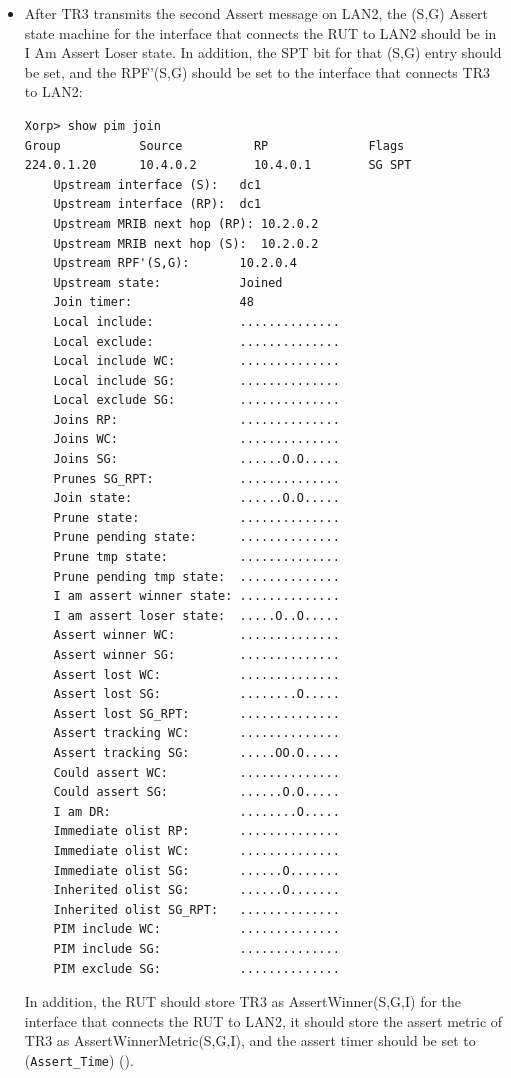 \documentclass[11pt]{report}
\begin{document}
\begin{itemize}
  \item After TR3 transmits the second Assert message on LAN2, the (S,G) Assert
  state machine for the interface that connects the RUT to LAN2 should be in I
  Am Assert Loser state. In addition, the SPT bit for that (S,G) entry should
  be set, and the RPF'(S,G) should be set to the interface that connects TR3
  to LAN2:

\begin{verbatim}
Xorp> show pim join 
Group           Source          RP              Flags
224.0.1.20      10.4.0.2        10.4.0.1        SG SPT 
    Upstream interface (S):   dc1
    Upstream interface (RP):  dc1
    Upstream MRIB next hop (RP): 10.2.0.2
    Upstream MRIB next hop (S):  10.2.0.2
    Upstream RPF'(S,G):       10.2.0.4
    Upstream state:           Joined 
    Join timer:               48
    Local include:            ..............
    Local exclude:            ..............
    Local include WC:         ..............
    Local include SG:         ..............
    Local exclude SG:         ..............
    Joins RP:                 ..............
    Joins WC:                 ..............
    Joins SG:                 ......O.O.....
    Prunes SG_RPT:            ..............
    Join state:               ......O.O.....
    Prune state:              ..............
    Prune pending state:      ..............
    Prune tmp state:          ..............
    Prune pending tmp state:  ..............
    I am assert winner state: ..............
    I am assert loser state:  .....O..O.....
    Assert winner WC:         ..............
    Assert winner SG:         ..............
    Assert lost WC:           ..............
    Assert lost SG:           ........O.....
    Assert lost SG_RPT:       ..............
    Assert tracking WC:       ..............
    Assert tracking SG:       .....OO.O.....
    Could assert WC:          ..............
    Could assert SG:          ......O.O.....
    I am DR:                  ........O.....
    Immediate olist RP:       ..............
    Immediate olist WC:       ..............
    Immediate olist SG:       ......O.......
    Inherited olist SG:       ......O.......
    Inherited olist SG_RPT:   ..............
    PIM include WC:           ..............
    PIM include SG:           ..............
    PIM exclude SG:           ..............
\end{verbatim}

  In addition, the RUT should store TR3 as AssertWinner(S,G,I) for the
  interface that connects the RUT to LAN2, it should store the assert metric
  of TR3 as AssertWinnerMetric(S,G,I), and the assert timer should be set to
  (\verb=Assert_Time=) ({\PimsmAssertTime}).

\end{itemize}
\end{document}
